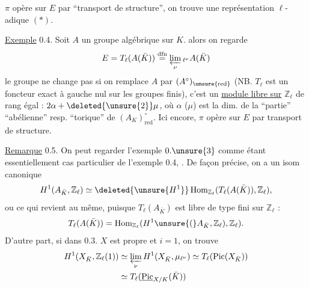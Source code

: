 
 $\pi$ opère sur  $E$ par ``transport de structure'', on trouve une représentation $\ell$-adique $(*)$.

\uline{Exemple} 0.4. Soit $A$ un  groupe algébrique  sur $K$.
 alors on regarde
\[
 E=T_\ell(A(\bar K))\overset{\mathrm{dfn}}=\varprojlim_\nu {}_{\ell^\nu}A(\bar K)
\]
 le groupe ne change pas si on remplace $A$ par $(A^\circ)_{\unsure{\mathrm{red}}}$ (NB. $T_\ell$ est un foncteur exact à gauche nul sur les groupes finis), c'est un  \uline{module libre sur} $\mathbb Z_\ell$ de rang égal : $2\alpha+\deleted{\unsure{2}}\mu$, où $\alpha$ ($\mu$) est la dim. de la ``partie'' ``abélienne'' resp.  ``torique'' de $(A_K)^\circ_{\mathrm{red}}$. Ici encore, $\pi$ opère sur $E$ par transport de structure.

\uline{Remarque} 0.5. On peut regarder l'exemple $0.\unsure{3}$ comme étant essentiellement   cas particulier de l'exemple 0.4, .
De façon précise,  on a un isom canonique
\[
 H^1(A_{\bar K},\mathbb Z_\ell)\simeq \deleted{\unsure{H^1}}\operatorname{Hom}_{\mathbb Z_\ell}(T_\ell(A(\bar K)),\mathbb Z_\ell),
\]
ou ce qui revient au même, puisque $T_\ell(A_{\bar K})$ est libre de type fini sur $\mathbb Z_\ell$ :
\[
 T_\ell(A(\bar K))=\operatorname{Hom}_{\mathbb Z_\ell}(H^1\unsure{(}A_{\bar K},\mathbb Z_\ell),\mathbb Z_\ell).
\]
D'autre part,  si  dans 0.3. $X$ est propre et $i=1$, on trouve
\[
\begin{aligned}
 H^1(X_{\bar K},\mathbb Z_\ell(1))&\simeq\varprojlim_\nu H^1(X_{\bar K},\mu_{\ell^\nu})\simeq T_\ell(\operatorname{Pic}(X_{\bar K}))\\
 &\simeq T_\ell(\underline{\operatorname{Pic}}_{X/K}(\bar K))
\end{aligned}
\]
